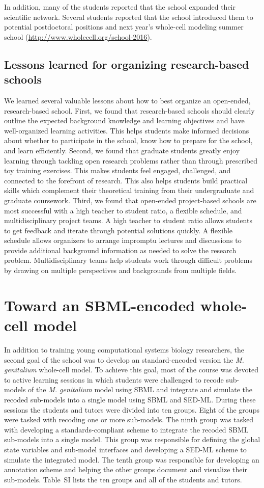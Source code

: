 \documentclass[journal,transmag]{IEEEtran}
\begin{document}
In addition, many of the students reported that the school expanded their scientific network.  Several students reported that the school introduced them to potential postdoctoral positions and next year's whole-cell modeling summer school (\href{http://www.wholecell.org/school-2016}{http://www.wholecell.org/school-2016}).

\subsection{Lessons learned for organizing research-based schools}
We learned several valuable lessons about how to best organize an open-ended, research-based school. First, we found that research-based schools should clearly outline the expected background knowledge and learning objectives and have well-organized learning activities. This helps students make informed decisions about whether to participate in the school, know how to prepare for the school, and learn efficiently. Second, we found that graduate students greatly enjoy learning through tackling open research problems rather than through prescribed toy training exercises. This makes students feel engaged, challenged, and connected to the forefront of research. This also helps students build practical skills which complement their theoretical training from their undergraduate and graduate coursework. Third, we found that open-ended project-based schools are most successful with a high teacher to student ratio, a flexible schedule, and multidisciplinary project teams. A high teacher to student ratio allows students to get feedback and iterate through potential solutions quickly. A flexible schedule allows organizers to arrange impromptu lectures and discussions to provide additional background information as needed to solve the research problem. Multidisciplinary teams help students work through difficult problems by drawing on multiple perspectives and backgrounds from multiple fields. 

\section{Toward an SBML-encoded whole-cell model}
In addition to training young computational systems biology researchers, the second goal of the school was to develop an standard-encoded version the \textit{M. genitalium} whole-cell model. To achieve this goal, most of the course was devoted to active learning sessions in which students were challenged to recode sub-models of the \textit{M. genitalium} model using SBML and integrate and simulate the recoded sub-models into a single model using SBML and SED-ML. During these sessions the students and tutors were divided into ten groups. Eight of the groups were tasked with recoding one or more sub-models. The ninth group was tasked with developing a standards-compliant scheme to integrate the recoded SBML sub-models into a single model. This group was responsible for defining the global state variables and sub-model interfaces and developing a SED-ML scheme to simulate the integrated model. The tenth group was responsible for developing an annotation scheme and helping the other groups document and visualize their sub-models. Table~SI lists the ten groups and all of the students and tutors. 
\end{document}

